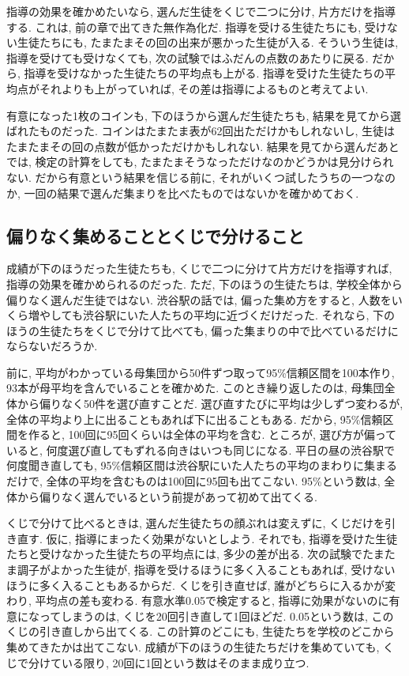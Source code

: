     指導の効果を確かめたいなら, 選んだ生徒をくじで二つに分け, 片方だけを指導する.
    これは, 前の章で出てきた無作為化だ.
    指導を受ける生徒たちにも, 受けない生徒たちにも, たまたまその回の出来が悪かった生徒が入る.
    そういう生徒は, 指導を受けても受けなくても, 次の試験ではふだんの点数のあたりに戻る.
    だから, 指導を受けなかった生徒たちの平均点も上がる.
    指導を受けた生徒たちの平均点がそれよりも上がっていれば, その差は指導によるものと考えてよい.

    有意になった1枚のコインも, 下のほうから選んだ生徒たちも, 結果を見てから選ばれたものだった.
    コインはたまたま表が62回出ただけかもしれないし, 生徒はたまたまその回の点数が低かっただけかもしれない.
    結果を見てから選んだあとでは, 検定の計算をしても, たまたまそうなっただけなのかどうかは見分けられない.
    だから有意という結果を信じる前に, それがいくつ試したうちの一つなのか, 一回の結果で選んだ集まりを比べたものではないかを確かめておく.

  \subsection{偏りなく集めることとくじで分けること}

    成績が下のほうだった生徒たちも, くじで二つに分けて片方だけを指導すれば, 指導の効果を確かめられるのだった.
    ただ, 下のほうの生徒たちは, 学校全体から偏りなく選んだ生徒ではない.
    渋谷駅の話では, 偏った集め方をすると, 人数をいくら増やしても渋谷駅にいた人たちの平均に近づくだけだった.
    それなら, 下のほうの生徒たちをくじで分けて比べても, 偏った集まりの中で比べているだけにならないだろうか.

    前に, 平均がわかっている母集団から50件ずつ取って95\%信頼区間を100本作り, 93本が母平均を含んでいることを確かめた.
    このとき繰り返したのは, 母集団全体から偏りなく50件を選び直すことだ.
    選び直すたびに平均は少しずつ変わるが, 全体の平均より上に出ることもあれば下に出ることもある.
    だから, 95\%信頼区間を作ると, 100回に95回くらいは全体の平均を含む.
    ところが, 選び方が偏っていると, 何度選び直してもずれる向きはいつも同じになる.
    平日の昼の渋谷駅で何度聞き直しても, 95\%信頼区間は渋谷駅にいた人たちの平均のまわりに集まるだけで, 全体の平均を含むものは100回に95回も出てこない.
    95\%という数は, 全体から偏りなく選んでいるという前提があって初めて出てくる.

    くじで分けて比べるときは, 選んだ生徒たちの顔ぶれは変えずに, くじだけを引き直す.
    仮に, 指導にまったく効果がないとしよう.
    それでも, 指導を受けた生徒たちと受けなかった生徒たちの平均点には, 多少の差が出る.
    次の試験でたまたま調子がよかった生徒が, 指導を受けるほうに多く入ることもあれば, 受けないほうに多く入ることもあるからだ.
    くじを引き直せば, 誰がどちらに入るかが変わり, 平均点の差も変わる.
    有意水準0.05で検定すると, 指導に効果がないのに有意になってしまうのは, くじを20回引き直して1回ほどだ.
    0.05という数は, このくじの引き直しから出てくる.
    この計算のどこにも, 生徒たちを学校のどこから集めてきたかは出てこない.
    成績が下のほうの生徒たちだけを集めていても, くじで分けている限り, 20回に1回という数はそのまま成り立つ.

